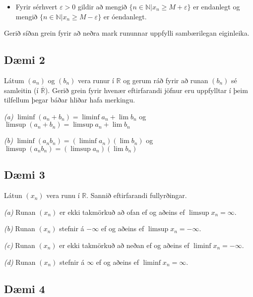 \documentclass[]{book}
\providecommand{\tightlist}{%
  \setlength{\itemsep}{0pt}\setlength{\parskip}{0pt}}
\begin{document}
\begin{itemize}
\tightlist
\item
  Fyrir sérhvert \(\varepsilon > 0\) gildir að mengið \(\{n \in \mathbb N | x_n \geq M + \varepsilon\}\) er endanlegt og mengið \(\{n \in \mathbb N | x_n \geq M - \varepsilon\}\) er óendanlegt.
\end{itemize}

Gerið síðan grein fyrir að neðra mark rununnar uppfylli sambærilegan eiginleika.

\hypertarget{dmi-2}{%
\subsection*{Dæmi 2}\label{dmi-2}}

Látum \((a_n)\) og \((b_n)\) vera runur í \(\mathbb R\) og gerum ráð fyrir að runan \((b_n)\) sé samleitin (í \(\overline{\mathbb R}\)). Gerið grein fyrir hvenær eftirfarandi jöfnur eru uppfylltar í þeim tilfellum þegar báðar hliðar hafa merkingu.

\emph{(a)} \(\liminf(a_n + b_n) = \liminf a_n + \lim b_n\) og \(\limsup(a_n + b_n) = \limsup a_n + \lim b_n\)

\emph{(b)} \(\liminf(a_nb_n) = (\liminf a_n)(\lim b_n)\) og \(\limsup(a_nb_n) = (\limsup a_n)(\lim b_n)\)

\hypertarget{dmi-3}{%
\subsection*{Dæmi 3}\label{dmi-3}}

Látun \((x_n)\) vera runu í \(\mathbb R\). Sannið eftirfarandi fullyrðingar.

\emph{(a)} Runan \((x_n)\) er ekki takmörkuð að ofan ef og aðeins ef \(\limsup x_n = \infty\).

\emph{(b)} Runan \((x_n)\) stefnir á \(-\infty\) ef og aðeins ef \(\limsup x_n = -\infty\).

\emph{(c)} Runan \((x_n)\) er ekki takmörkuð að neðan ef og aðeins ef \(\liminf x_n = -\infty\).

\emph{(d)} Runan \((x_n)\) stefnir á \(\infty\) ef og aðeins ef \(\liminf x_n = \infty\).

\hypertarget{dmi-4}{%
\subsection*{Dæmi 4}\label{dmi-4}}
\end{document}
